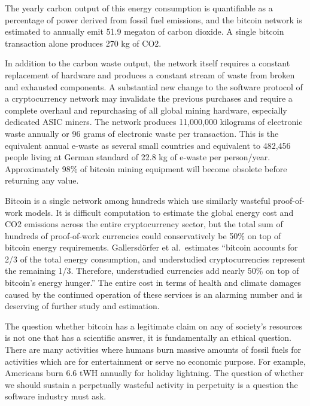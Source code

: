 The yearly carbon output of this energy consumption is quantifiable as a
percentage of power derived from fossil fuel emissions, and the bitcoin
network is estimated to annually emit 51.9 megaton of carbon dioxide.
A single bitcoin transaction alone produces 270 kg of CO2.
\cite{goodkind2020cryptodamages, de2020bitcoin}

In addition to the carbon waste output, the network itself requires a constant
replacement of hardware and produces a constant stream of waste from broken and
exhausted components. \cite{DEVRIES2021105901} A substantial new change to the software protocol of a
cryptocurrency network may invalidate the previous purchases and require a
complete overhaul and repurchasing of all global mining hardware, especially
dedicated ASIC miners. The network produces 11,000,000 kilograms of electronic
waste annually or 96 grams of electronic waste per transaction. This is the
equivalent annual e-waste as several small countries and equivalent to 482,456
people living at German standard of 22.8 kg of e-waste per person/year.
Approximately 98\% of bitcoin mining equipment will become obsolete before
returning any value. \cite{peplow2019}


Bitcoin is a single network among hundreds which use similarly wasteful
proof-of-work models. It is difficult computation to estimate the global energy
cost and CO2 emissions across the entire cryptocurrency sector, but the total
sum of hundreds of proof-of-work currencies could conservatively be 50\% on top
of bitcoin energy requirements.  Gallersd{\"o}rfer et al.~estimates ``bitcoin
accounts for 2/3 of the total energy consumption, and understudied
cryptocurrencies represent the remaining 1/3. Therefore, understudied currencies
add nearly 50\% on top of bitcoin's energy hunger.'' The entire cost in terms of
health and climate damages caused by the continued operation of these services
is an alarming number and is deserving of further study and estimation.
\cite{gallersdorfer2020energy, de2019renewable}


The question whether bitcoin has a legitimate claim on any of society's
resources is not one that has a scientific answer, it is fundamentally
an ethical question. There are many activities where humans burn massive
amounts of fossil fuels for activities which are for entertainment or
serve no economic purpose. For example, Americans burn 6.6 tWH annually
for holiday lightning. The question of whether we should sustain a
perpetually wasteful activity in perpetuity is a question the software
industry must ask.

